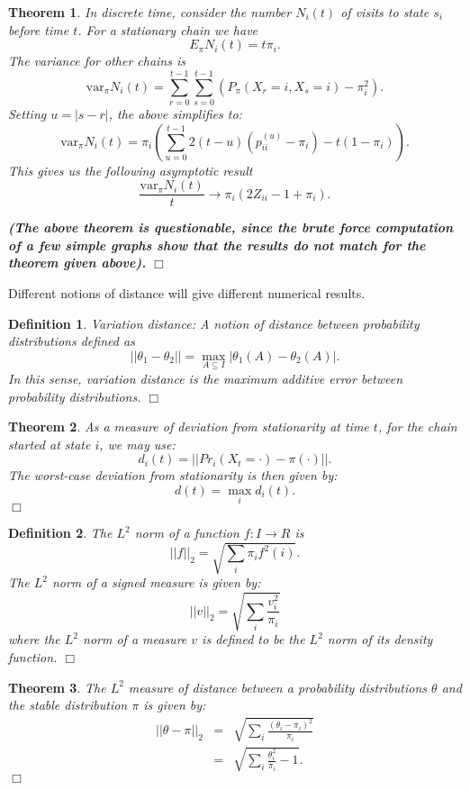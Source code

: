 \documentclass[11pt, letterpaper]{article}
\newenvironment{definition}
{\noindent\begin{defn}}
{\hfill $\Box$ \end{defn}}
\newtheorem{defn}{Definition}
\newenvironment{theorem}
{\noindent\begin{thm}}
{\hfill $\Box$ \end{thm}}
\newtheorem{thm}{Theorem}
\begin{document}
\begin{theorem}
In discrete time, consider the number $N_i(t)$ of visits to state $s_i$ before time $t$.  For a stationary chain we have
\[
	E_{\pi}N_i(t) = t\pi_i.
\]
The variance for other chains is
\[
	\textrm{var}_\pi N_i(t) = \sum_{r=0}^{t-1} \sum_{s=0}^{t-1} ( P_\pi (X_r = i, X_s = i) - \pi_i^2).
\]
Setting $u = |s-r|$, the above simplifies to:
\[
	\textrm{var}_\pi N_i(t) = \pi_i \left( \sum_{u=0}^{t-1} 2(t-u)(p_{ii}^{(u)} - \pi_i) - t(1-\pi_i) \right).
\]
This gives us the following asymptotic result
\[
	\frac{\textrm{var}_\pi N_i(t)}{t} \rightarrow \pi_i(2Z_{ii} - 1 + \pi_i).
\]

\textbf{(The above theorem is questionable, since the brute force computation of a few simple graphs show that the results do not match for the theorem given above).}
\end{theorem}

Different notions of distance will give different numerical results.

\begin{definition}
\textit{Variation distance}: A notion of distance between probability distributions defined as
\[
	||\theta_1 - \theta_2|| = \max_{A \subseteq I}  | \theta_1(A) - \theta_2(A) |.
\]
In this sense, variation distance is the maximum \textit{additive} error between probability distributions.
\end{definition}

\begin{theorem}
As a measure of deviation from stationarity at time $t$, for the chain started at state $i$, we may use:
\[
	d_i(t) = ||Pr_i(X_t = \cdot) - \pi(\cdot)||.
\]
The worst-case deviation from stationarity is then given by:
\[
	d(t) = \max_i d_i(t).
\]
\end{theorem}

\begin{definition}
The $L^2$ norm of a function $f : I \rightarrow R$ is
\[
	||f||_2 = \sqrt {\sum_i \pi_i f^2(i)}.
\]
The $L^2$ norm of a signed measure is given by:
\[
	||v||_2 = \sqrt {\sum_i \frac{v_i^2}{\pi_i}}
\]
where the $L^2$ norm of a measure $v$ is defined to be the $L^2$ norm of its density function.
\end{definition}

\begin{theorem}
The $L^2$ measure of distance between a probability distributions $\theta$ and the stable distribution $\pi$ is given by:
\begin{eqnarray*}
	||\theta - \pi||_2 & = & \sqrt{ \sum_i \frac{(\theta_i - \pi_i)^2}{\pi_i}} \\
	& = & \sqrt{ \sum_i \frac{\theta_i^2}{\pi_i} - 1}.
\end{eqnarray*}
\end{theorem}
\end{document}
